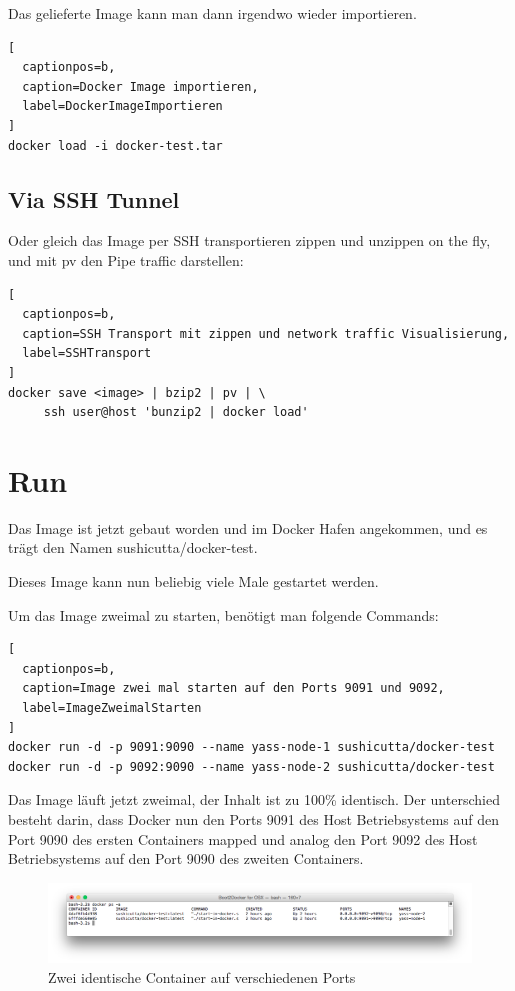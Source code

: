 Das gelieferte Image kann man dann irgendwo wieder importieren.
\\

\begin{lstlisting}[
  captionpos=b,
  caption=Docker Image importieren,
  label=DockerImageImportieren
]
docker load -i docker-test.tar
\end{lstlisting}

\subsection{Via SSH Tunnel}

Oder gleich das Image per SSH transportieren zippen und unzippen on the fly, und mit pv den
Pipe traffic darstellen:
\\

\begin{lstlisting}[
  captionpos=b,
  caption=SSH Transport mit zippen und network traffic Visualisierung,
  label=SSHTransport
]
docker save <image> | bzip2 | pv | \
     ssh user@host 'bunzip2 | docker load'
\end{lstlisting}

\section{Run}

Das Image ist jetzt gebaut worden und im Docker Hafen angekommen, und es trägt den Namen
sushicutta/docker-test.

Dieses Image kann nun beliebig viele Male gestartet werden.

Um das Image zweimal zu starten, benötigt man folgende Commands:
\\

\begin{lstlisting}[
  captionpos=b,
  caption=Image zwei mal starten auf den Ports 9091 und 9092,
  label=ImageZweimalStarten
]
docker run -d -p 9091:9090 --name yass-node-1 sushicutta/docker-test
docker run -d -p 9092:9090 --name yass-node-2 sushicutta/docker-test
\end{lstlisting}

Das Image läuft jetzt zweimal, der Inhalt ist zu 100\% identisch. Der unterschied
besteht darin, dass Docker nun den Ports 9091 des Host Betriebsystems auf den Port 9090 des
ersten Containers mapped und analog den Port 9092 des Host Betriebsystems auf den Port 9090
des zweiten Containers.

\begin{figure}[htbp]
  \begin{center}
    \includegraphics[width=1.0\textwidth]{./images/twoProcesses.png}
    \caption{Zwei identische Container auf verschiedenen Ports}
    \label{img:twoProcesses}
  \end{center}
\end{figure}

